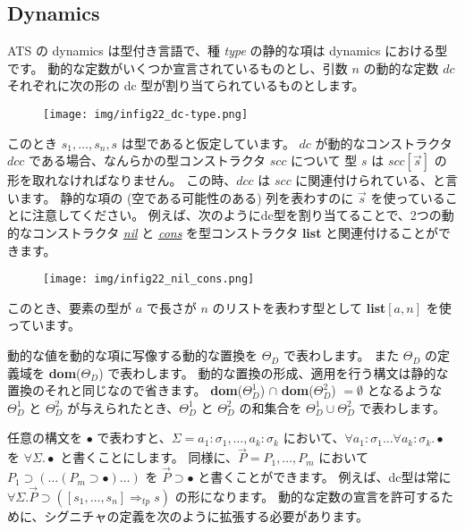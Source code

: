 \documentclass[submit,techreq,noauthor,onecolumn]{ipsj}
\begin{document}
\subsection{Dynamics}

ATS の dynamics は型付き言語で、種 {\it type} の静的な項は dynamics における型です。
動的な定数がいくつか宣言されているものとし、引数 $n$ の動的な定数 $dc$ それぞれに次の形の dc 型が割り当てられているものとします。

\begin{figure}[h]
\centering
\texttt{[image: img/infig22\_dc-type.png]}
\end{figure}

\noindent このとき $s_1,\ldots,s_n,s$ は型であると仮定しています。
$dc$ が動的なコンストラクタ $dcc$ である場合、なんらかの型コンストラクタ $scc$ について 型 $s$ は $scc[\vec{s}]$ の形を取れなければなりません。
この時、$dcc$ は $scc$ に関連付けられている、と言います。
静的な項の (空である可能性のある) 列を表わすのに $\vec{s}$ を使っていることに注意してください。
例えば、次のようにdc型を割り当てることで、2つの動的なコンストラクタ {\it \underline{nil}} と {\it \underline{cons}} を型コンストラクタ {\bf list} と関連付けることができます。

\begin{figure}[h]
\centering
\texttt{[image: img/infig22\_nil\_cons.png]}
\end{figure}

\noindent このとき、要素の型が $a$ で長さが $n$ のリストを表わす型として {\bf list}$[a,n]$ を使っています。

動的な値を動的な項に写像する動的な置換を $\Theta_D$ で表わします。
また $\Theta_D$ の定義域を {\bf dom}($\Theta_D$) で表わします。
動的な置換の形成、適用を行う構文は静的な置換のそれと同じなので省きます。
{\bf dom}($\Theta^1_D$) $\cap$ {\bf dom}($\Theta^2_D$) $= \emptyset$ となるような $\Theta^1_D$ と $\Theta^2_D$ が与えられたとき、$\Theta^1_D$ と $\Theta^2_D$ の和集合を $\Theta^1_D \cup \Theta^2_D$ で表わします。

任意の構文を $\bullet$ で表わすと、$\Sigma = a_1 : \sigma_1,\ldots,a_k : \sigma_k$ において、$\forall a_1:\sigma_1 \ldots \forall a_k:\sigma_k .\bullet$ を $\forall\Sigma.\bullet$ と書くことにします。
同様に、$\vec{P} = P_1,\ldots,P_m$ において $P_1 \supset (\ldots(P_m \supset \bullet)\ldots)$ を $\vec{P} \supset \bullet$ と書くことができます。
例えば、dc型は常に $\forall \Sigma.\vec{P} \supset ([s_1,\ldots,s_n] \Rightarrow_{tp} s)$ の形になります。
動的な定数の宣言を許可するために、シグニチャの定義を次のように拡張する必要があります。
\end{document}
